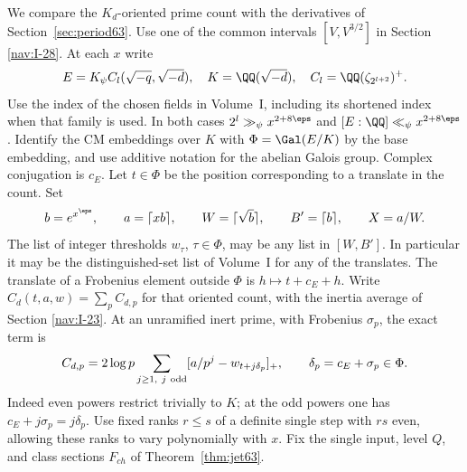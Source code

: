 \documentclass[a4paper,11pt]{article}
\theoremstyle{definition}
\theoremstyle{remark}
\numberwithin{equation}{section}
\begin{document}
We compare the \(K_d\)-oriented prime count with the
derivatives of Section~\ref{sec:period63}. Use one of the common
intervals \([V,V^{3/2}]\) in
Section \ref{nav:I-28}.
At each \(x\) write
\[
 E=K_\psi C_l(\sqrt{-q},\sqrt{-d}),\quad
 K=\QQ(\sqrt{-d}),\quad C_l=\QQ(\zeta_{2^{l+2}})^+ .
\]
Use the index of the chosen fields in Volume~I, including its
shortened index when that family is used. In both cases
\(2^l\gg_\psi x^{2+8\eps}\) and \([E:\QQ]\ll_\psi x^{2+8\eps}\).
Identify the CM embeddings over \(K\) with
\(\Phi=\Gal(E/K)\) by the base embedding, and use additive
notation for the abelian Galois group. Complex conjugation is
\(c_E\). Let \(t\in\Phi\) be the position corresponding to a
translate in the count. Set
\[
 b=e^{x^\eps},\qquad a=\lceil xb\rceil,\qquad
 W=\lceil\sqrt b\rceil,\qquad B'=\lceil b\rceil,\qquad X=a/W .
\]
The list of integer thresholds \(w_\tau\), \(\tau\in\Phi\), may
be any list in \([W,B']\). In particular it may be the
distinguished-set list of Volume~I for any of the translates.
The translate of a Frobenius element outside \(\Phi\) is
\(h\mapsto t+c_E+h\). Write \(C_d(t,a,w)=\sum_p C_{d,p}\)
for that oriented count, with the inertia average of Section \ref{nav:I-23}. At an unramified inert prime, with Frobenius
\(\sigma_p\), the exact term is
\begin{equation}
 C_{d,p}=2\log p\sum_{j\ge1,\ j\ {\rm odd}}
       [a/p^j-w_{t+j\delta_p}]_+,\qquad \delta_p=c_E+\sigma_p\in\Phi .
                                                        \label{eq:cp73}
\end{equation}
Indeed even powers restrict trivially to \(K\); at the odd
powers one has \(c_E+j\sigma_p=j\delta_p\).
Use fixed ranks \(r\le s\) of a definite single step with
\(rs\) even, allowing these ranks to vary polynomially with
\(x\). Fix the single input, level \(Q\), and class sections
\(F_{ch}\) of Theorem~\ref{thm:jet63}.
\end{document}

